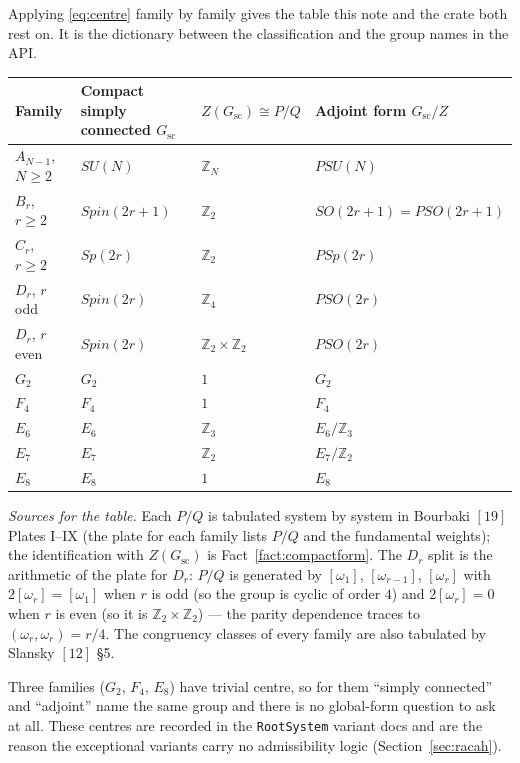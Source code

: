 \documentclass[11pt,a4paper]{article}
\theoremstyle{plain}
\theoremstyle{definition}
\newcommand{\ZZ}{\mathbb{Z}}
\newcommand{\code}[1]{\texttt{#1}}
\begin{document}
Applying \eqref{eq:centre} family by family gives the table this note and the
crate both rest on. It is the dictionary between the classification and the
group names in the API.

\begin{center}
\small
\begin{tabular}{@{}llll@{}}
\toprule
Family & Compact simply connected $G_{\mathrm{sc}}$ & $Z(G_{\mathrm{sc}})\cong P/Q$ & Adjoint form $G_{\mathrm{sc}}/Z$ \\
\midrule
$A_{N-1}$, $N\ge 2$ & $SU(N)$      & $\ZZ_N$ & $PSU(N)$ \\
$B_r$, $r\ge 2$     & $Spin(2r+1)$ & $\ZZ_2$ & $SO(2r+1)=PSO(2r+1)$ \\
$C_r$, $r\ge 2$     & $Sp(2r)$     & $\ZZ_2$ & $PSp(2r)$ \\
$D_r$, $r$ odd      & $Spin(2r)$   & $\ZZ_4$ & $PSO(2r)$ \\
$D_r$, $r$ even     & $Spin(2r)$   & $\ZZ_2\times\ZZ_2$ & $PSO(2r)$ \\
$G_2$               & $G_2$        & $1$     & $G_2$ \\
$F_4$               & $F_4$        & $1$     & $F_4$ \\
$E_6$               & $E_6$        & $\ZZ_3$ & $E_6/\ZZ_3$ \\
$E_7$               & $E_7$        & $\ZZ_2$ & $E_7/\ZZ_2$ \\
$E_8$               & $E_8$        & $1$     & $E_8$ \\
\bottomrule
\end{tabular}
\end{center}

\noindent
\emph{Sources for the table.} Each $P/Q$ is tabulated system by system in
Bourbaki $[19]$ Plates I--IX (the plate for each family lists $P/Q$ and the
fundamental weights); the identification with $Z(G_{\mathrm{sc}})$ is
Fact~\ref{fact:compactform}. The $D_r$ split is the arithmetic of the plate
for $D_r$: $P/Q$ is generated by $[\omega_1]$, $[\omega_{r-1}]$,
$[\omega_r]$ with $2[\omega_r] = [\omega_1]$ when $r$ is odd (so the group is
cyclic of order $4$) and $2[\omega_r]=0$ when $r$ is even (so it is
$\ZZ_2\times\ZZ_2$) --- the parity dependence traces to
$(\omega_r,\omega_r)=r/4$. The congruency classes of every family are also
tabulated by Slansky $[12]$ \S5.

\medskip
\noindent
Three families ($G_2$, $F_4$, $E_8$) have trivial centre, so for them
``simply connected'' and ``adjoint'' name the same group and there is no
global-form question to ask at all. These centres are recorded in the
\code{RootSystem} variant docs and are the reason the exceptional variants
carry no admissibility logic (Section~\ref{sec:racah}).
\end{document}
